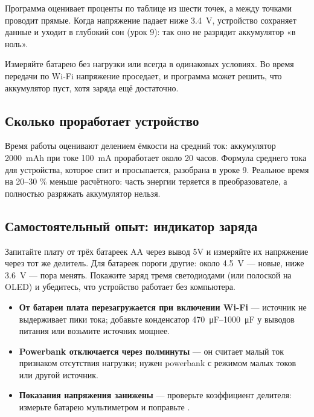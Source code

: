 Программа оценивает проценты по таблице из шести точек, а между точками проводит прямые. Когда
напряжение падает ниже \SI{3.4}{V}, устройство сохраняет данные и уходит в глубокий сон (урок 9): так
оно не разрядит аккумулятор «в ноль».

\begin{caution}
Измеряйте батарею без нагрузки или всегда в одинаковых условиях. Во время передачи по Wi-Fi напряжение
проседает, и программа может решить, что аккумулятор пуст, хотя заряда ещё достаточно.
\end{caution}

\subsection{Сколько проработает устройство}

Время работы оценивают делением ёмкости на средний ток: аккумулятор \SI{2000}{mAh} при токе \SI{100}{mA}
проработает около 20 часов. Формула среднего тока для устройства, которое спит и просыпается, разобрана
в уроке 9. Реальное время на 20--30 \% меньше расчётного: часть энергии теряется в преобразователе,
а полностью разряжать аккумулятор нельзя.

\subsection{Самостоятельный опыт: индикатор заряда}

Запитайте плату от трёх батареек AA через вывод 5V и измеряйте их напряжение через тот же делитель.
Для батареек пороги другие: около \SI{4.5}{V} --- новые, ниже \SI{3.6}{V} --- пора менять. Покажите
заряд тремя светодиодами (или полоской на OLED) и убедитесь, что устройство работает без компьютера.

\begin{trouble}
\begin{itemize}[leftmargin=*]
  \item \textbf{От батареи плата перезагружается при включении Wi-Fi} --- источник не выдерживает пики
        тока; добавьте конденсатор \SIrange{470}{1000}{\micro F} у выводов питания или возьмите источник мощнее.
  \item \textbf{Powerbank отключается через полминуты} --- он считает малый ток признаком отсутствия нагрузки;
        нужен powerbank с режимом малых токов или другой источник.
  \item \textbf{Показания напряжения занижены} --- проверьте коэффициент делителя: измерьте батарею мультиметром и поправьте .
\end{itemize}
\end{trouble}

